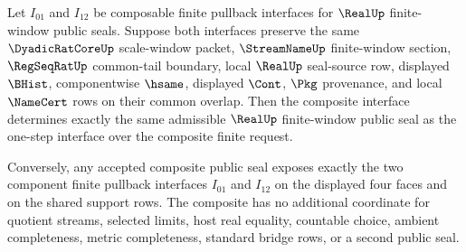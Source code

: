 \begin{theorem}
\label{thm:real-l10-four-face-interface-composition}
Let $I_{01}$ and $I_{12}$ be composable finite pullback interfaces for $\RealUp$ finite-window public seals. Suppose both interfaces preserve the same $\DyadicRatCoreUp$ scale-window packet, $\StreamNameUp$ finite-window section, $\RegSeqRatUp$ common-tail boundary, local $\RealUp$ seal-source row, displayed $\BHist$, componentwise $\hsame$, displayed $\Cont$, $\Pkg$ provenance, and local $\NameCert$ rows on their common overlap. Then the composite interface determines exactly the same admissible $\RealUp$ finite-window public seal as the one-step interface over the composite finite request.

Conversely, any accepted composite public seal exposes exactly the two component finite pullback interfaces $I_{01}$ and $I_{12}$ on the displayed four faces and on the shared support rows. The composite has no additional coordinate for quotient streams, selected limits, host real equality, countable choice, ambient completeness, metric completeness, standard bridge rows, or a second public seal.
\end{theorem}
